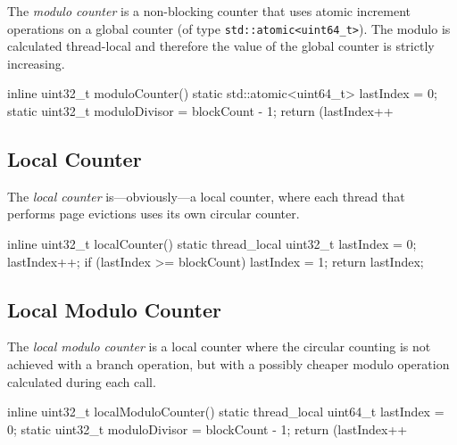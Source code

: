    The \emph{modulo counter} is a non-blocking counter that uses atomic increment operations on a global counter (of type \lstinline{std::atomic<uint64_t>}). The modulo is calculated thread-local and therefore the value of the global counter is strictly increasing.

\begin{@empty}
    \lstset{
        language = [ISO]C++
    }
\begin{centeredshadowboxlisting}
inline uint32_t moduloCounter() {
    static std::atomic<uint64_t> lastIndex = 0;
    static uint32_t moduloDivisor = blockCount
                                  - 1;
    return (lastIndex++ %
}
\end{centeredshadowboxlisting}
\end{@empty}

\subsection[Local Counter]{Local Counter} \label{subsec:local_counter}

    The \emph{local counter} is---obviously---a local counter, where each thread that performs page evictions uses its own circular counter.

\begin{@empty}
    \lstset{
        language = [ISO]C++
    }
\begin{centeredshadowboxlisting}
inline uint32_t localCounter() {
    static thread_local uint32_t lastIndex = 0;
    lastIndex++;
    if (lastIndex >= blockCount) {
        lastIndex = 1;
    }
    return lastIndex;
}
\end{centeredshadowboxlisting}
\end{@empty}

\subsection[Local Modulo Counter]{Local Modulo Counter} \label{subsec:local_modulo_counter}

    The \emph{local modulo counter} is a local counter where the circular counting is not achieved with a branch operation, but with a possibly cheaper modulo operation calculated during each call.

\begin{@empty}
    \lstset{
        language = [ISO]C++
    }
\begin{centeredshadowboxlisting}
inline uint32_t localModuloCounter() {
    static thread_local uint64_t lastIndex = 0;
    static uint32_t moduloDivisor = blockCount
                                  - 1;
    return (lastIndex++ %
}
\end{centeredshadowboxlisting}
\end{@empty}

